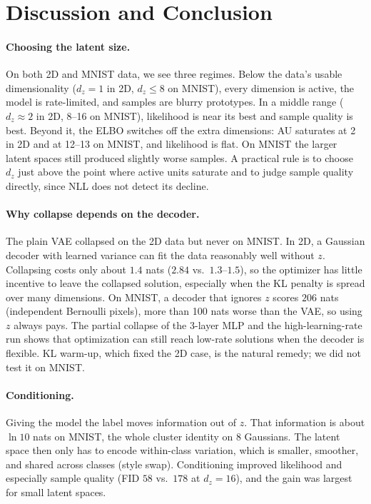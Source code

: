 \documentclass[10pt]{article}
\begin{document}
\section{Discussion and Conclusion}

\paragraph{Choosing the latent size.} On both 2D and MNIST data, we see
three regimes. Below the data's usable dimensionality ($d_z=1$ in 2D,
$d_z\le8$ on MNIST), every dimension is active, the model is
rate-limited, and samples are blurry prototypes. In a middle range
($d_z\approx2$ in 2D, 8--16 on MNIST), likelihood is near its best and
sample quality is best. Beyond it, the ELBO switches off the extra
dimensions: AU saturates at 2 in 2D and at 12--13 on MNIST, and
likelihood is flat. On MNIST the larger latent spaces still produced
slightly worse samples. A practical rule is to choose $d_z$ just above the
point where active units saturate and to judge sample quality directly,
since NLL does not detect its decline.

\paragraph{Why collapse depends on the decoder.} The plain VAE collapsed on
the 2D data but never on MNIST. In 2D, a Gaussian decoder with learned
variance can fit the data reasonably well without $z$. Collapsing costs
only about $1.4$ nats ($2.84$ vs.\ $1.3$--$1.5$), so the optimizer has
little incentive to leave the collapsed solution, especially when the KL
penalty is spread over many dimensions. On MNIST, a decoder that ignores
$z$ scores $206$ nats (independent Bernoulli pixels), more than 100 nats
worse than the VAE, so using $z$ always pays. The partial collapse of the
3-layer MLP and the high-learning-rate run shows that optimization can still
reach low-rate solutions when the decoder is flexible. KL warm-up, which
fixed the 2D case, is the natural remedy; we did not test it on MNIST.

\paragraph{Conditioning.} Giving the model the label moves information out
of $z$. That information is about $\ln10$ nats on MNIST, the whole cluster
identity on 8 Gaussians. The latent space then only has to encode
within-class variation, which is smaller, smoother, and shared across
classes (style swap). Conditioning improved likelihood and especially
sample quality (FID $58$ vs.\ $178$ at $d_z=16$), and the gain was largest
for small latent spaces.
\end{document}

